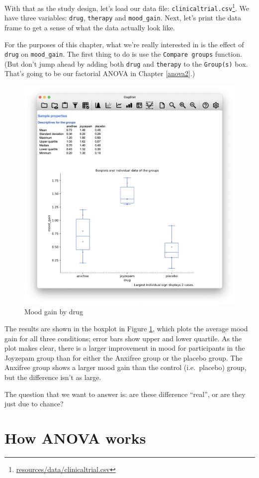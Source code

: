 \documentclass[
  11pt,
  a4paper,
  twoside,symmetric,openright]{book}
\theoremstyle{break}
\theoremstyle{break}
\DeclareRobustCommand{\href}[2]{#2\footnote{\url{#1}}}
\begin{document}
With that as the study design, let's load our data file: \href{resources/data/clinicaltrial.csv}{\texttt{clinicaltrial.csv}}. We have three variables: \texttt{drug}, \texttt{therapy} and \texttt{mood\_gain}. Next, let's print the data frame to get a sense of what the data actually look like.

For the purposes of this chapter, what we're really interested in is the effect of \texttt{drug} on \texttt{mood\_gain}. The first thing to do is use the \texttt{Compare\ groups} function. (But don't jump ahead by adding both \texttt{drug} and \texttt{therapy} to the \texttt{Group(s)} box. That's going to be our factorial ANOVA in Chapter \ref{anova2}.)

\begin{figure}

{\centering \includegraphics[width=0.6\linewidth]{resources/image/moodbydrug} 

}

\caption{Mood gain by drug}\label{fig:moodbydrug}
\end{figure}

The results are shown in the boxplot in Figure \ref{fig:moodbydrug}, which plots the average mood gain for all three conditions; error bars show upper and lower quartile. As the plot makes clear, there is a larger improvement in mood for participants in the Joyzepam group than for either the Anxifree group or the placebo group. The Anxifree group shows a larger mood gain than the control (i.e.~placebo) group, but the difference isn't as large.

The question that we want to answer is: are these difference ``real'', or are they just due to chance?

\section{How ANOVA works}\label{anovaintro}
\end{document}
